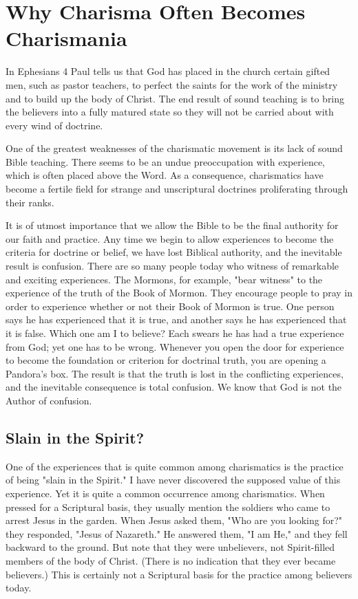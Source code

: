 \chapter{Why Charisma Often Becomes Charismania}

In Ephesians 4 Paul tells us that God has placed in the church certain gifted men, such as pastor teachers, to perfect the saints for the work of the ministry and to build up the body of Christ. The end result of sound teaching is to bring the believers into a fully matured state so they will not be carried about with every wind of doctrine. 

One of the greatest weaknesses of the charismatic movement is its lack of sound Bible teaching. There seems to be an undue preoccupation with experience, which is often placed above the Word. As a consequence, charismatics have become a fertile field for strange and unscriptural doctrines proliferating through their ranks. 

It is of utmost importance that we allow the Bible to be the final authority for our faith and practice. Any time we begin to allow experiences to become the criteria for doctrine or belief, we have lost Biblical authority, and the inevitable result is confusion. There are so many people today who witness of remarkable and exciting experiences. The Mormons, for example, "bear witness" to the experience of the truth of the Book of Mormon. They encourage people to pray in order to experience whether or not their Book of Mormon is true. One person says he has experienced that it is true, and another says he has experienced that it is false. Which one am I to believe? Each swears he has had a true experience from God; yet one has to be wrong. Whenever you open the door for experience to become the foundation or criterion for doctrinal truth, you are opening a Pandora's box. The result is that the truth is lost in the conflicting experiences, and the inevitable consequence is total confusion. We know that God is not the Author of confusion. 

\section*{Slain in the Spirit?}

One of the experiences that is quite common among charismatics is the practice of being "slain in the Spirit." I have never discovered the supposed value of this experience. Yet it is quite a common occurrence among charismatics. When pressed for a Scriptural basis, they usually mention the soldiers who came to arrest Jesus in the garden. When Jesus asked them, "Who are you looking for?" they responded, "Jesus of Nazareth." He answered them, "I am He," and they fell backward to the ground. But note that they were unbelievers, not Spirit-filled members of the body of Christ. (There is no indication that they ever became believers.) This is certainly not a Scriptural basis for the practice among believers today. 

